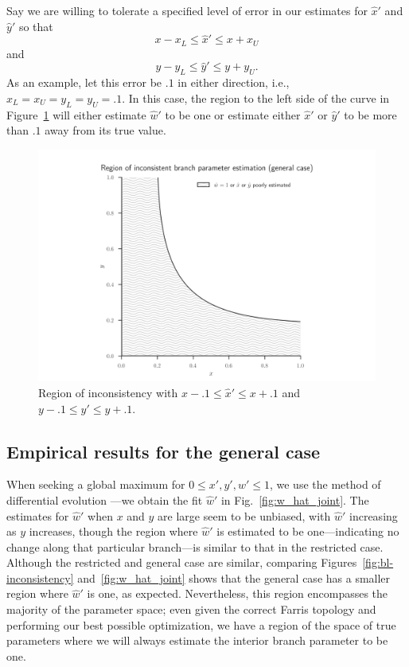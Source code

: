 \documentclass{article}
\begin{document}
Say we are willing to tolerate a specified level of error in our estimates for $\hat{x}'$ and $\hat{y}'$ so that
$$
x-x_{L} \le \hat{x}' \le x+x_{U}
$$
and
$$
y-y_{L} \le \hat{y}' \le y+y_{U}.
$$
As an example, let this error be $.1$ in either direction, i.e., $x_{L}=x_{U}=y_{L}=y_{U}=.1$.
In this case, the region to the left side of the curve in Figure~\ref{fig:bl-loose-inconsistency} will either estimate $\hat{w}'$ to be one or estimate either $\hat{x}'$ or $\hat{y}'$ to be more than $.1$ away from its true value.

\begin{figure}
\centering
\includegraphics[width=.9\textwidth]{bl-loose-inconsistency-inkscape}
\caption{Region of inconsistency with $x-.1 \le \hat{x}' \le x+.1$ and $y-.1 \le \hat{y}' \le y+.1$.}
\label{fig:bl-loose-inconsistency}
\end{figure}

\subsection{Empirical results for the general case}

When seeking a global maximum for $0 \le x',y',w' \le 1$, we use the method of differential evolution \cite{Storn1997}---we obtain the fit $\hat{w}'$ in Fig.~\ref{fig:w_hat_joint}.
The estimates for $\hat{w}'$ when $x$ and $y$ are large seem to be unbiased, with $\hat{w}'$ increasing as $y$ increases, though the region where $\hat{w}'$ is estimated to be one---indicating no change along that particular branch---is similar to that in the restricted case.
Although the restricted and general case are similar, comparing Figures~\ref{fig:bl-inconsistency} and~\ref{fig:w_hat_joint} shows that the general case has a smaller region where $\hat{w}'$ is one, as expected.
Nevertheless, this region encompasses the majority of the parameter space; even given the correct Farris topology and performing our best possible optimization, we have a region of the space of true parameters where we will always estimate the interior branch parameter to be one.
\end{document}
